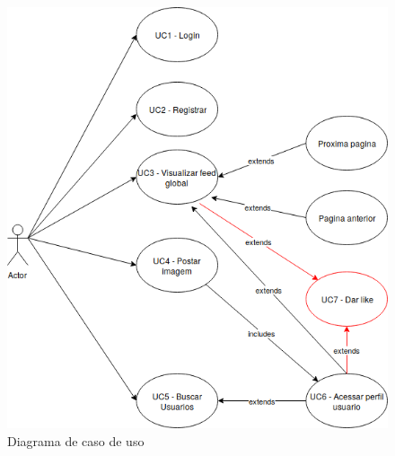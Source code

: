 \begin{figure}[ht]
	\centering
	\includegraphics[width=\textwidth]{./g/casodeuso.png}
	\caption{Diagrama de caso de uso}
	\label{fig:casoDeUso}
\end{figure}

